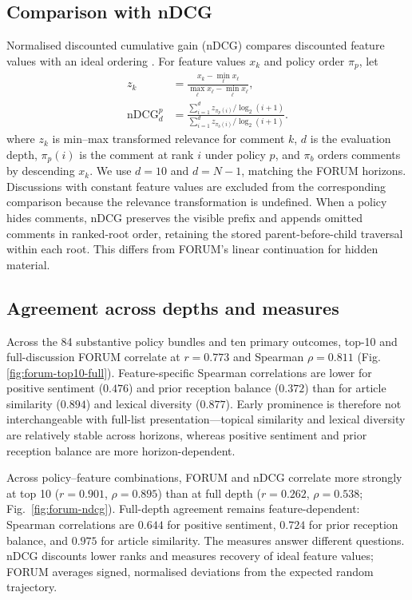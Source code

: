 \subsection{Comparison with nDCG}

Normalised discounted cumulative gain (nDCG) compares discounted feature values with an ideal ordering \citep{Wang2013}. For feature values $x_k$ and policy order $\pi_p$, let
\begin{equation}
\begin{aligned}
z_k&=\frac{x_k-\min_\ell x_\ell}{\max_\ell x_\ell-\min_\ell x_\ell},\\
\operatorname{nDCG}_d^p&=
\frac{\sum_{i=1}^{d}z_{\pi_p(i)}/\log_2(i+1)}
{\sum_{i=1}^{d}z_{\pi_b(i)}/\log_2(i+1)}.
\end{aligned}
\end{equation}
where $z_k$ is min--max transformed relevance for comment $k$, $d$ is the evaluation depth, $\pi_p(i)$ is the comment at rank $i$ under policy $p$, and $\pi_b$ orders comments by descending $x_k$. We use $d=10$ and $d=N-1$, matching the FORUM horizons. Discussions with constant feature values are excluded from the corresponding comparison because the relevance transformation is undefined. When a policy hides comments, nDCG preserves the visible prefix and appends omitted comments in ranked-root order, retaining the stored parent-before-child traversal within each root. This differs from FORUM's linear continuation for hidden material.

\subsection{Agreement across depths and measures}
Across the 84 substantive policy bundles and ten primary outcomes, top-10 and full-discussion FORUM correlate at $r=0.773$ and Spearman $\rho=0.811$ (Fig. \ref{fig:forum-top10-full}). Feature-specific Spearman correlations are lower for positive sentiment ($0.476$) and prior reception balance ($0.372$) than for article similarity ($0.894$) and lexical diversity ($0.877$). Early prominence is therefore not interchangeable with full-list presentation---topical similarity and lexical diversity are relatively stable across horizons, whereas positive sentiment and prior reception balance are more horizon-dependent.

Across policy--feature combinations, FORUM and nDCG correlate more strongly at top 10 ($r=0.901$, $\rho=0.895$) than at full depth ($r=0.262$, $\rho=0.538$; Fig.~\ref{fig:forum-ndcg}). Full-depth agreement remains feature-dependent: Spearman correlations are $0.644$ for positive sentiment, $0.724$ for prior reception balance, and $0.975$ for article similarity. The measures answer different questions. nDCG discounts lower ranks and measures recovery of ideal feature values; FORUM averages signed, normalised deviations from the expected random trajectory.

